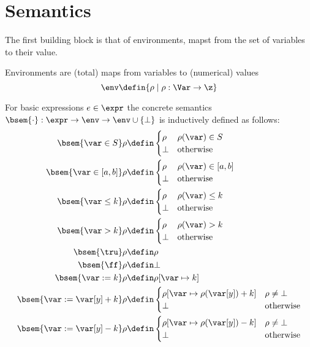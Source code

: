 \section{Semantics}

The first building block is that of environments, mapst from the set
of variables to their value.

\begin{definition}[Environments]
  Environments are (total) maps from variables to (numerical)
  values \[\env \defin \{\rho \mid \rho : \Var \to \z\}\]
\end{definition}

\begin{definition}
  For basic expressions \(e \in \expr\) the concrete semantics \(\bsem{
    \cdot} : \expr \to \env \to \env \cup \{\bot\}\) is inductively
  defined as follows:
  \begin{align*}
    \bsem{\var\in S} \rho & \defin \begin{cases} \rho & \rho(\var)\in S \\ \bot & \text{otherwise} \end{cases} \\
    \bsem{\var\in [a,b]} \rho & \defin \begin{cases} \rho & \rho(\var)\in [a,b] \\ \bot & \text{otherwise} \end{cases} \\
    \bsem{\var\leq k} \rho & \defin \begin{cases} \rho & \rho(\var)\leq k \\ \bot & \text{otherwise} \end{cases} \\
    \bsem{\var> k} \rho & \defin \begin{cases} \rho & \rho(\var) > k \\ \bot & \text{otherwise} \end{cases} \\
    \bsem{\tru} \rho & \defin \rho \\
    \bsem{\ff} \rho & \defin \bot \\
    \bsem{\var:= k} \rho & \defin \rho [\var\mapsto k] \\
    \bsem{\var:= \var[y] + k} \rho & \defin \begin{cases} \rho [\var\mapsto \rho(\var[y]) + k] & \rho \neq \bot \\ \bot & \text{otherwise}\end{cases} \\
    \bsem{\var:= \var[y] - k} \rho & \defin \begin{cases} \rho [\var\mapsto \rho(\var[y]) - k] & \rho \neq \bot \\ \bot & \text{otherwise}\end{cases} \\
  \end{align*}
\end{definition}

